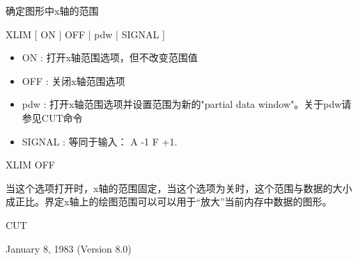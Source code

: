 \label{cmd:xlim}

确定图形中x轴的范围

XLIM [ ON | OFF | pdw | SIGNAL ]

\begin{itemize}
\item ON : 打开x轴范围选项，但不改变范围值 
\item OFF : 关闭x轴范围选项 
\item pdw : 打开x轴范围选项并设置范围为新的"partial data window"。关于pdw请参见CUT命令 
\item SIGNAL : 等同于输入： A -1 F +1. 
\end{itemize}

XLIM OFF

当这个选项打开时，x轴的范围固定，当这个选项为关时，这个范围与数据的大小成正比。界定x轴上的绘图范围可以可以用于``放大''当前内存中数据的图形。

CUT

January 8, 1983 (Version 8.0)
